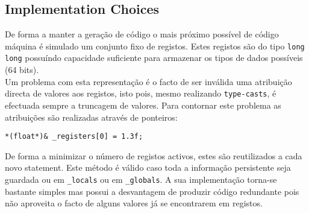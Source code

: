 \documentclass[a4paper]{article}
\begin{document}
\subsection{Implementation Choices}
\indent \indent De forma a manter a geração de código o mais próximo possível de código máquina é simulado um conjunto fixo de registos.
Estes registos são do tipo \texttt{long long} possuíndo capacidade suficiente para armazenar os tipos de dados possíveis (64 bits). \\
\indent Um problema com esta representação é o facto de ser inválida uma atribuição directa de valores aos registos, isto pois, mesmo realizando
\texttt{type-casts}, é efectuada sempre a truncagem de valores. Para contornar este problema as atribuições são realizadas através de ponteiros:

\begin{center}
	\verb!*(float*)& _registers[0] = 1.3f;!
\end{center}

\indent De forma a minimizar o número de registos activos, estes são reutilizados a cada novo statement.
Este método é válido caso toda a informação persistente seja guardada ou em \texttt{\_locals} ou em \texttt{\_globals}. A sua implementação torna-se bastante simples mas possui a desvantagem de produzir código redundante pois
não aproveita o facto de alguns valores já se encontrarem em registos.


\cleardoublepage
\end{document}
